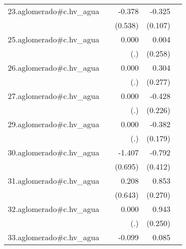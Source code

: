 {\begin{longtable}{l*{4}{D{.}{.}{-1}}}
\addlinespace
23.aglomerado#c.hv\_agua&                     &      -0.378         &      -0.325\sym{**} &                     \\
            &                     &     (0.538)         &     (0.107)         &                     \\
\addlinespace
25.aglomerado#c.hv\_agua&                     &       0.000         &       0.004         &                     \\
            &                     &         (.)         &     (0.258)         &                     \\
\addlinespace
26.aglomerado#c.hv\_agua&                     &       0.000         &       0.304         &                     \\
            &                     &         (.)         &     (0.277)         &                     \\
\addlinespace
27.aglomerado#c.hv\_agua&                     &       0.000         &      -0.428         &                     \\
            &                     &         (.)         &     (0.226)         &                     \\
\addlinespace
29.aglomerado#c.hv\_agua&                     &       0.000         &      -0.382\sym{*}  &                     \\
            &                     &         (.)         &     (0.179)         &                     \\
\addlinespace
30.aglomerado#c.hv\_agua&                     &      -1.407\sym{*}  &      -0.792         &                     \\
            &                     &     (0.695)         &     (0.412)         &                     \\
\addlinespace
31.aglomerado#c.hv\_agua&                     &       0.208         &       0.853\sym{**} &                     \\
            &                     &     (0.643)         &     (0.270)         &                     \\
\addlinespace
32.aglomerado#c.hv\_agua&                     &       0.000         &       0.943\sym{***}&                     \\
            &                     &         (.)         &     (0.250)         &                     \\
\addlinespace
33.aglomerado#c.hv\_agua&                     &      -0.099         &       0.085         &                     \\

\end{longtable}}
